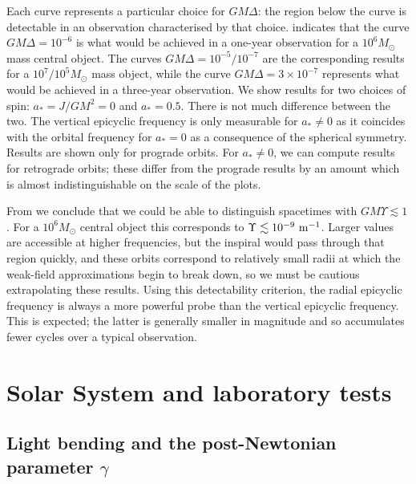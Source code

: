 Each curve represents a particular choice for $GM\Delta$: the region below the curve is detectable in an observation characterised by that choice.  indicates that the curve $GM\Delta = 10^{-6}$ is what would be achieved in a one-year observation for a $10^6 M_\odot$ mass central object. The curves $GM\Delta = 10^{-5}/10^{-7}$ are the corresponding results for a $10^7/10^5M_\odot$ mass object, while the curve $GM\Delta = 3 \times 10^{-7}$ represents what would be achieved in a three-year observation. We show results for two choices of spin: $a_\ast = J/GM^2 = 0$ and $a_\ast = 0.5$. There is not much difference between the two. The vertical epicyclic frequency is only measurable for $a_\ast \neq 0$ as it coincides with the orbital frequency for $a_\ast = 0$ as a consequence of the spherical symmetry. Results are shown only for prograde orbits. For $a_\ast \neq 0$, we can compute results for retrograde orbits; these differ from the prograde results by an amount which is almost indistinguishable on the scale of the plots.

From  we conclude that we could be able to distinguish spacetimes with $GM\Upsilon \lesssim 1 $. For a $10^6 M_\odot$ central object this corresponds to $\Upsilon \lesssim 10^{-9}~\mathrm{m^{-1}}$. Larger values are accessible at higher frequencies, but the inspiral would pass through that region quickly, and these orbits correspond to relatively small radii at which the weak-field approximations begin to break down, so we must be cautious extrapolating these results. Using this detectability criterion, the radial epicyclic frequency is always a more powerful probe than the vertical epicyclic frequency. This is expected; the latter is generally smaller in magnitude and so accumulates fewer cycles over a typical observation.

\section{Solar System and laboratory tests}\label{sec:Tests}

\subsection{Light bending and the post-Newtonian parameter $\gamma$}

